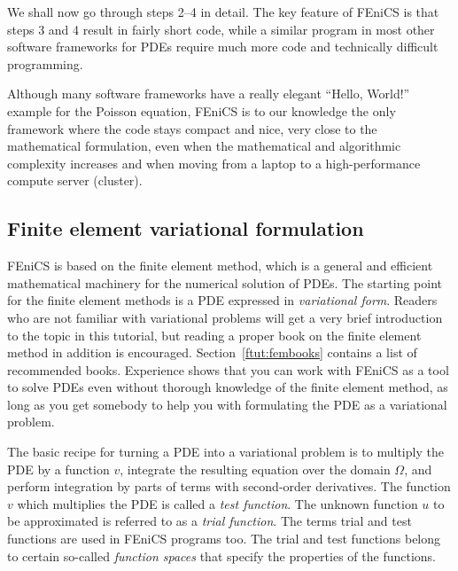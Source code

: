 \documentclass[graybox,envcountchap,sectrefs,final]{svmonodo}
\newenvironment{notice_mdfboxadmon}[1][]{
\begin{notice_mdfboxmdframed}[frametitle=#1]
}
{
\end{notice_mdfboxmdframed}
}
\begin{document}
\noindent
We shall now go through steps 2--4 in detail. The key feature of
FEniCS is that steps 3 and 4 result in fairly short code, while a
similar program in most other software frameworks for PDEs require
much more code and technically difficult programming.


\begin{notice_mdfboxadmon}
Although many software frameworks have a really elegant
``Hello, World!'' example for the
Poisson equation, FEniCS is to our knowledge the only framework where
the code stays compact and nice, very close to the mathematical
formulation, even when the mathematical and algorithmic complexity
increases and when moving from a laptop to a high-performance
compute server (cluster).
\end{notice_mdfboxadmon} %



\subsection{Finite element variational formulation}
\label{ch:poisson0:varform}

FEniCS is based on the finite element method, which is a general and
efficient mathematical machinery for the numerical solution of
PDEs. The starting point for the finite element methods is a PDE
expressed in \emph{variational form}. Readers who are not familiar with
variational problems will get a very brief introduction to the topic
in this tutorial, but reading a proper book on the finite element
method in addition is encouraged. Section~\ref{ftut:fembooks} contains
a list of recommended books. Experience shows that you can work with
FEniCS as a tool to solve PDEs even without thorough knowledge of
the finite element method, as long as you get somebody to help you
with formulating the PDE as a variational problem.


The basic recipe for turning a PDE into a variational problem is to
multiply the PDE by a function $v$, integrate the resulting equation
over the domain $\Omega$, and perform integration by parts of terms
with second-order derivatives. The function $v$ which multiplies the
PDE is called a \emph{test function}. The unknown function $u$ to be
approximated is referred to as a \emph{trial function}. The terms trial and
test functions are used in FEniCS programs too. The trial and test
functions belong to certain so-called \emph{function spaces} that specify
the properties of the functions.
\end{document}

